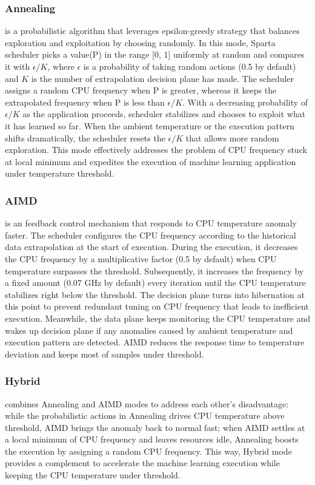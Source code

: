 \subsubsection{Annealing} is a probabilistic algorithm that leverages epsilon-greedy strategy that balances exploration and exploitation by choosing randomly. In this mode, Sparta scheduler picks a value(P) in the range [0, 1] uniformly at random and compares it with $\epsilon/K$, where $\epsilon$ is a probability of taking random actions (0.5 by default) and $K$ is the number of extrapolation decision plane has made. The scheduler assigns a random CPU frequency when P is greater, whereas it keeps the extrapolated frequency when P is less than $\epsilon/K$. With a decreasing probability of $\epsilon/K$ as the application proceeds, scheduler stabilizes and chooses to exploit what it has learned so far. When the ambient temperature or the execution pattern shifts dramatically, the scheduler resets the $\epsilon/K$ that allows more random exploration. This mode effectively addresses the problem of CPU frequency stuck at local minimum and expedites the execution of machine learning application under temperature threshold.

\subsubsection{AIMD} is an feedback control mechanism that responds to CPU temperature anomaly faster. The scheduler configures the CPU frequency according to the historical data extrapolation at the start of execution. During the execution, it decreases the CPU frequency by a multiplicative factor (0.5 by default) when CPU temperature surpasses the threshold. Subsequently, it increases the frequency by a fixed amount (0.07 GHz by default) every iteration until the CPU temperature stabilizes right below the threshold. The decision plane turns into hibernation at this point to prevent redundant tuning on CPU frequency that leads to inefficient execution. Meanwhile, the data plane keeps monitoring the CPU temperature and wakes up decision plane if any anomalies caused by ambient temperature and execution pattern are detected. AIMD reduces the response time to temperature deviation and keeps most of samples under threshold. 

\subsubsection{Hybrid} combines Annealing and AIMD modes to address each other's disadvantage: while the probabilistic actions in Annealing drives CPU temperature above threshold, AIMD brings the anomaly back to normal fast; when AIMD settles at a local minimum of CPU frequency and leaves resources idle, Annealing boosts the execution by assigning a random CPU frequency. This way, Hybrid mode provides a complement to accelerate the machine learning execution while keeping the CPU temperature under threshold. 
